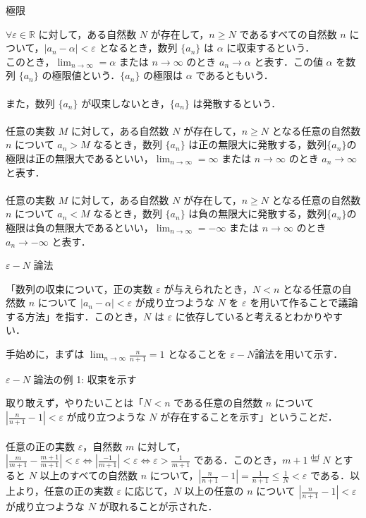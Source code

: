 \documentclass[a4paper]{ltjsarticle}
\begin{document}
\begin{mytcb}{極限}{}

$\forall \varepsilon \in \mathbb{R}$ に対して，ある自然数 $N$ が存在して，$n \geq N$ であるすべての自然数 $n$ について，$|a_n - \alpha| < \varepsilon$ となるとき，数列 $\{a_n\}$ は $\alpha$ に収束するという．\\
このとき，$\lim_{n \to \infty} = \alpha$ または $n \to \infty$ のとき $a_n \to \alpha$ と表す．この値 $\alpha$ を数列 $\{a_n\}$ の極限値という．$\{a_n\}$ の極限は $\alpha$ であるともいう．\\
\\
また，数列 $\{a_n\}$ が収束しないとき，$\{a_n\}$ は発散するという．\\
\\
任意の実数 $M$ に対して，ある自然数 $N$ が存在して，$n \geq N$ となる任意の自然数 $n$ について $a_n > M$ なるとき，数列 $\{a_n\}$ は正の無限大に発散する，数列$\{a_n\}$の極限は正の無限大であるといい，$\lim_{n \to \infty} = \infty$ または $n \to \infty$ のとき $a_n \to \infty$ と表す．\\
\\
任意の実数 $M$ に対して，ある自然数 $N$ が存在して，$n \geq N$ となる任意の自然数 $n$ について $a_n < M$ なるとき，数列 $\{a_n\}$ は負の無限大に発散する，数列$\{a_n\}$の極限は負の無限大であるといい，$\lim_{n \to \infty} = -\infty$ または $n \to \infty$ のとき $a_n \to -\infty$ と表す．

\end{mytcb}

\begin{mytcb}{$\varepsilon - N$ 論法}{}

「数列の収束について，正の実数 $\varepsilon$ が与えられたとき，$N < n$ となる任意の自然数 $n$ について $|a_n - \alpha| < \varepsilon$ が成り立つような $N$ を $\varepsilon$ を用いて作ることで議論する方法」を指す．このとき，$N$ は $\varepsilon$ に依存していると考えるとわかりやすい． 

\end{mytcb}
手始めに，まずは $\lim_{n \to \infty} \frac{n}{n + 1} = 1$ となることを $\varepsilon - N $論法を用いて示す． 

\begin{mytcb}{$\varepsilon - N$ 論法の例 1: 収束を示す}{}

取り敢えず，やりたいことは「$N < n$ である任意の自然数 $n$ について $|\frac{n}{n + 1} - 1| < \varepsilon$ が成り立つような $N$ が存在することを示す」ということだ．
\\
\\
任意の正の実数 $\varepsilon$，自然数 $m$ に対して，$|\frac{m}{m + 1} - \frac{m + 1}{m + 1}| < \varepsilon \Leftrightarrow |\frac{-1}{m + 1}| < \varepsilon \Leftrightarrow  \varepsilon  > \frac{1}{m + 1}$ である．このとき，$m + 1 \stackrel{\mathrm{def}}{=} N$ とすると $N$ 以上のすべての自然数 $n$ について，$|\frac{n}{n + 1} - 1| = \frac{1}{n + 1} \leq \frac{1}{N} < \varepsilon$ である．以上より，任意の正の実数 $\varepsilon$ に応じて，$N$ 以上の任意の $n$ について $|\frac{n}{n + 1} - 1| < \varepsilon$ が成り立つような $N$ が取れることが示された．

\end{mytcb}
\end{document}
